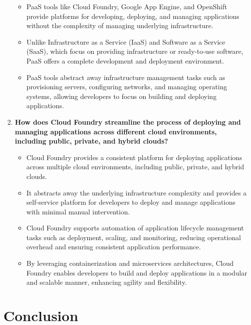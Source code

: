 \documentclass[11pt]{article}
\begin{document}
\begin{enumerate}
          \begin{itemize}
              \item PaaS tools like Cloud Foundry, Google App Engine, and OpenShift provide platforms for developing, deploying, and managing applications without the complexity of managing underlying infrastructure.
              \item Unlike Infrastructure as a Service (IaaS) and Software as a Service (SaaS), which focus on providing infrastructure or ready-to-use software, PaaS offers a complete development and deployment environment.
              \item PaaS tools abstract away infrastructure management tasks such as provisioning servers, configuring networks, and managing operating systems, allowing developers to focus on building and deploying applications.
          \end{itemize}
    \item \textbf{How does Cloud Foundry streamline the process of deploying and managing applications across different cloud environments, including public, private, and hybrid clouds?}\\
          \begin{itemize}
              \item Cloud Foundry provides a consistent platform for deploying applications across multiple cloud environments, including public, private, and hybrid clouds.
              \item It abstracts away the underlying infrastructure complexity and provides a self-service platform for developers to deploy and manage applications with minimal manual intervention.
              \item Cloud Foundry supports automation of application lifecycle management tasks such as deployment, scaling, and monitoring, reducing operational overhead and ensuring consistent application performance.
              \item By leveraging containerization and microservices architectures, Cloud Foundry enables developers to build and deploy applications in a modular and scalable manner, enhancing agility and flexibility.
          \end{itemize}
\end{enumerate}

\section{Conclusion}
\end{document}
